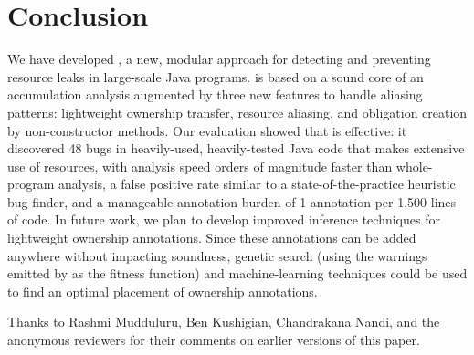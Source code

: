 \documentclass[sigconf,review]{acmart}
\begin{document}
\maketitle



















\section{Conclusion}

We have developed \Tool, a new, modular approach for detecting and preventing
resource leaks in large-scale Java programs.  \Tool is based on a sound core of
an accumulation analysis augmented by three new features to handle aliasing
patterns: lightweight ownership transfer, resource aliasing, and obligation
creation by non-constructor methods.  Our evaluation showed that \Tool is
effective: it discovered 48 bugs in heavily-used, heavily-tested Java code that
makes extensive use of resources, with analysis speed orders of magnitude faster
than whole-program analysis, a false positive rate similar to a
state-of-the-practice heuristic bug-finder, and a manageable annotation burden
of 1 annotation per 1,500 lines of code. In future work, we plan to develop
improved inference techniques for lightweight ownership annotations.  Since
these annotations can be added anywhere without impacting soundness, genetic
search (using the warnings emitted by \Tool as the fitness function)
and machine-learning techniques could be used to find an optimal placement
of ownership annotations.

\begin{acks}
Thanks to Rashmi Mudduluru, Ben Kushigian, Chandrakana Nandi, and the
anonymous reviewers for their comments on earlier versions of this
paper.
\end{acks}




\end{document}
